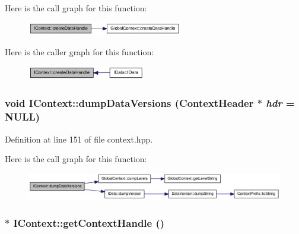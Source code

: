 Here is the call graph for this function:\nopagebreak
\begin{figure}[H]
\begin{center}
\leavevmode
\includegraphics[width=192pt]{class_i_context_a2ef87189437c74906f961a523602b6c3_cgraph}
\end{center}
\end{figure}


Here is the caller graph for this function:\nopagebreak
\begin{figure}[H]
\begin{center}
\leavevmode
\includegraphics[width=146pt]{class_i_context_a2ef87189437c74906f961a523602b6c3_icgraph}
\end{center}
\end{figure}
\hypertarget{class_i_context_a7f31c062cbdd616553a6c46a4422a1cb}{
\subsubsection[{dumpDataVersions}]{\setlength{\rightskip}{0pt plus 5cm}void IContext::dumpDataVersions ({\bf ContextHeader} $\ast$ {\em hdr} = {\ttfamily NULL})}}
\label{class_i_context_a7f31c062cbdd616553a6c46a4422a1cb}


Definition at line 151 of file context.hpp.

Here is the call graph for this function:\nopagebreak
\begin{figure}[H]
\begin{center}
\leavevmode
\includegraphics[width=349pt]{class_i_context_a7f31c062cbdd616553a6c46a4422a1cb_cgraph}
\end{center}
\end{figure}
\hypertarget{class_i_context_a63664480f4eede6b3a5ab572dd454160}{
\subsubsection[{getContextHandle}]{$\ast$ IContext::getContextHandle ()}}
\label{class_i_context_a63664480f4eede6b3a5ab572dd454160}


